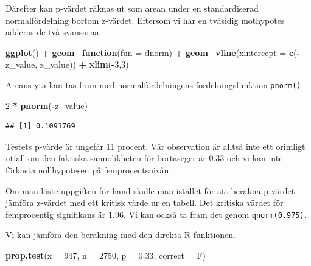 \documentclass[
]{book}
\newenvironment{Shaded}{\begin{snugshade}}{\end{snugshade}}
\newcommand{\AttributeTok}[1]{\textcolor[rgb]{0.13,0.29,0.53}{#1}}
\newcommand{\DecValTok}[1]{\textcolor[rgb]{0.00,0.00,0.81}{#1}}
\newcommand{\FloatTok}[1]{\textcolor[rgb]{0.00,0.00,0.81}{#1}}
\newcommand{\FunctionTok}[1]{\textcolor[rgb]{0.13,0.29,0.53}{\textbf{#1}}}
\newcommand{\NormalTok}[1]{#1}
\newcommand{\SpecialCharTok}[1]{\textcolor[rgb]{0.81,0.36,0.00}{\textbf{#1}}}
\theoremstyle{definition}
\theoremstyle{definition}
\theoremstyle{definition}
\theoremstyle{definition}
\theoremstyle{remark}
\begin{document}
Därefter kan p-värdet räknas ut som arean under en standardiserad normalfördelning bortom z-värdet. Eftersom vi har en tvåsidig mothypotes adderas de två svansarna.

\begin{Shaded}
\begin{Highlighting}[]
\FunctionTok{ggplot}\NormalTok{() }\SpecialCharTok{+}
  \FunctionTok{geom\_function}\NormalTok{(}\AttributeTok{fun =}\NormalTok{ dnorm) }\SpecialCharTok{+}
  \FunctionTok{geom\_vline}\NormalTok{(}\AttributeTok{xintercept =} \FunctionTok{c}\NormalTok{(}\SpecialCharTok{{-}}\NormalTok{z\_value, z\_value)) }\SpecialCharTok{+}
  \FunctionTok{xlim}\NormalTok{(}\SpecialCharTok{{-}}\DecValTok{3}\NormalTok{,}\DecValTok{3}\NormalTok{)}
\end{Highlighting}
\end{Shaded}

Areans yta kan tas fram med normalfördelningens fördelningsfunktion \texttt{pnorm()}.

\begin{Shaded}
\begin{Highlighting}[]
\DecValTok{2} \SpecialCharTok{*} \FunctionTok{pnorm}\NormalTok{(}\SpecialCharTok{{-}}\NormalTok{z\_value)}
\end{Highlighting}
\end{Shaded}

\begin{verbatim}
## [1] 0.1091769
\end{verbatim}

Testets p-värde är ungefär 11 procent. Vår observation är alltså inte ett orimligt utfall om den faktiska sannolikheten för bortaseger är 0.33 och vi kan inte förkasta nollhypotesen på femprocentsnivån.

Om man löste uppgiften för hand skulle man istället för att beräkna p-värdet jämföra z-värdet med ett kritisk värde ur en tabell. Det kritiska värdet för femprocentig signifikans är 1.96. Vi kan också ta fram det genom \texttt{qnorm(0.975)}.

Vi kan jämföra den beräkning med den direkta R-funktionen.

\begin{Shaded}
\begin{Highlighting}[]
\FunctionTok{prop.test}\NormalTok{(}\AttributeTok{x =} \DecValTok{947}\NormalTok{, }\AttributeTok{n =} \DecValTok{2750}\NormalTok{, }\AttributeTok{p =} \FloatTok{0.33}\NormalTok{, }\AttributeTok{correct =}\NormalTok{ F)}
\end{Highlighting}
\end{Shaded}
\end{document}
